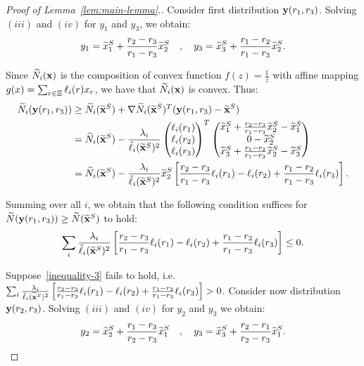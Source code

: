 \documentclass[12pt]{article}
\begin{document}
\begin{proof}[Proof of Lemma~\ref{lem:main-lemma}.]
Consider first distribution $\mathbf{y}(r_1,r_3)$. Solving $(iii)$ and $(iv)$ for $y_1$ and $y_3$, we obtain:
\begin{align*}
y_{1} = \widetilde{x}^S_1 + \frac{r_2-r_3}{r_1-r_3}\widetilde{x}^S_2 \quad , \quad y_3 = \widetilde{x}^S_3 + \frac{r_1-r_2}{r_1-r_3} \widetilde{x}^S_2.
\end{align*}

Since $\widetilde{N}_i(\mathbf{x})$ is the composition of convex function $f(z) = \frac1z$ with affine mapping $g(x) = \sum_{r\in\Xi} \ell_i(r)x_r$, we have that $\widetilde{N}_i(\mathbf{x})$ is convex. Thus:
\begin{align*}
\widetilde{N}_i(\mathbf{y}(r_1,r_3)) &\geq \widetilde{N}_i(\widetilde{\mathbf{x}}^S) + \nabla \widetilde{N}_i(\widetilde{\mathbf{x}}^S)^T(\mathbf{y}(r_1,r_3) - \widetilde{\mathbf{x}}^S) \\
&= \widetilde{N}_i(\widetilde{\mathbf{x}}^S) - \frac{\lambda_i}{\hat{\ell}_i(\widetilde{\mathbf{x}}^S)^2}\begin{pmatrix}
\ell_{i}(r_1)\\
\ell_{i}(r_2) \\
\ell_i(r_3)
\end{pmatrix}^T	\begin{pmatrix}
\widetilde{x}^S_1 + \frac{r_2-r_3}{r_1-r_3}\widetilde{x}^S_2 - \widetilde{x}^S_1\\
0-\widetilde{x}^S_2 \\
\widetilde{x}^S_3 + \frac{r_1-r_2}{r_1-r_3} \widetilde{x}^S_2 - \widetilde{x}^S_3
\end{pmatrix} \\
&= \widetilde{N}_i(\widetilde{\mathbf{x}}^S) - \frac{\lambda_i}{\hat{\ell}_i(\widetilde{\mathbf{x}}^S)^2}\widetilde{x}^S_2\left[\frac{r_2-r_3}{r_1-r_3}\ell_{i}(r_1)- \ell_{i}(r_2) + \frac{r_1-r_2}{r_1-r_3}\ell_{i}(r_3)\right].
\end{align*}


Summing over all $i$, we obtain that the following condition suffices for $\widetilde{N}(\mathbf{y}(r_1,r_3)) \geq \widetilde{N}(\widetilde{\mathbf{x}}^S)$ to hold:
\begin{align}\label{inequality-3}
\sum_i \frac{\lambda_i}{\hat{\ell}_i(\widetilde{\mathbf{x}}^S)^2}\left[\frac{r_2-r_3}{r_1-r_3}\ell_{i}(r_1)- \ell_{i}(r_2) + \frac{r_1-r_2}{r_1-r_3}\ell_{i}(r_3)\right] \leq 0.
\end{align}

Suppose~\eqref{inequality-3} fails to hold, i.e. $\sum_i \frac{\lambda_i}{\hat{\ell}_i(\widetilde{\mathbf{x}}^S)^2}\left[\frac{r_2-r_3}{r_1-r_3}\ell_{i}(r_1)- \ell_{i}(r_2) + \frac{r_1-r_2}{r_1-r_3}\ell_{i}(r_3)\right] > 0$. Consider now distribution $\mathbf{y}(r_2,r_3)$. Solving $(iii)$ and $(iv)$ for $y_{2}$ and $y_3$ we obtain:
$$y_2 = \widetilde{x}^S_2 + \frac{r_1-r_3}{r_2-r_3}\widetilde{x}^S_1 \quad , \quad y_3 = \widetilde{x}^S_3 + \frac{r_2-r_1}{r_2-r_3}\widetilde{x}^S_1.$$


\end{proof}
\end{document}
